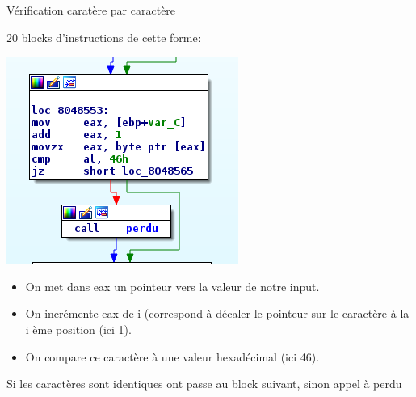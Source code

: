 \documentclass[10pt,sans,usenames,dvipsnames,french,compress]{beamer}
\begin{document}
		\begin{frame}[fragile]{Vérification caratère par caractère}
		\begin{block}{}
		   20 blocks d'instructions de cette forme:    
 \begin{center}
			\includegraphics[height=0.2\linewidth]{114/cmpcara.png}
			
		\end{center}
		
		\end{block}
\begin{block}{}
	  \begin{itemize}
	      \item On met dans eax un pointeur vers la valeur de notre input.
	      \item On incrémente eax de i (correspond à décaler le pointeur sur le caractère à la i ème position (ici 1).
	      \item On compare ce caractère à une valeur hexadécimal (ici 46).
	  \end{itemize}
		\end{block}
		\begin{block}{}
		      Si les caractères sont identiques ont passe au block suivant, sinon appel à perdu
		\end{block}
		\end{frame}
		
\end{document}
